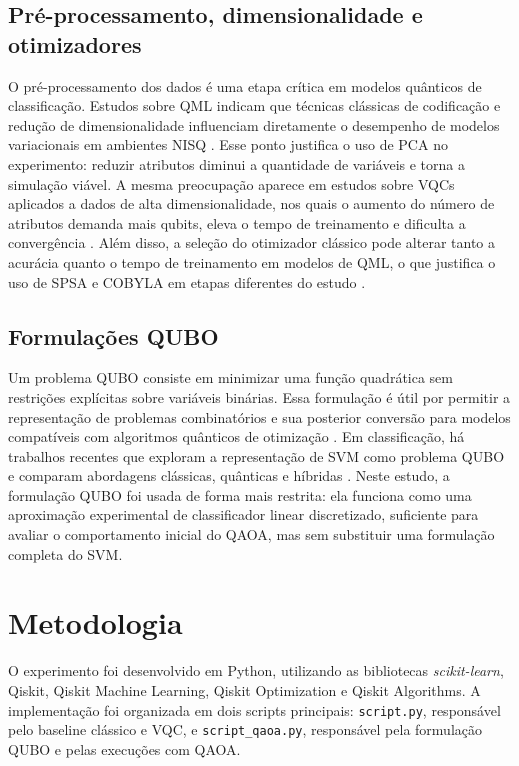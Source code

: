 \documentclass[12pt]{unisenaiclass}
\begin{document}
\subsection{Pré-processamento, dimensionalidade e otimizadores}

O pré-processamento dos dados é uma etapa crítica em modelos quânticos de classificação. Estudos sobre QML indicam que técnicas clássicas de codificação e redução de dimensionalidade influenciam diretamente o desempenho de modelos variacionais em ambientes NISQ \cite{mancilla2022qmlpreprocessing}. Esse ponto justifica o uso de PCA no experimento: reduzir atributos diminui a quantidade de variáveis e torna a simulação viável. A mesma preocupação aparece em estudos sobre VQCs aplicados a dados de alta dimensionalidade, nos quais o aumento do número de atributos demanda mais qubits, eleva o tempo de treinamento e dificulta a convergência \cite{qi2025hevqc}. Além disso, a seleção do otimizador clássico pode alterar tanto a acurácia quanto o tempo de treinamento em modelos de QML, o que justifica o uso de SPSA e COBYLA em etapas diferentes do estudo \cite{alajmi2025qmloptimizers}.

\subsection{Formulações QUBO}

Um problema QUBO consiste em minimizar uma função quadrática sem restrições explícitas sobre variáveis binárias. Essa formulação é útil por permitir a representação de problemas combinatórios e sua posterior conversão para modelos compatíveis com algoritmos quânticos de otimização \cite{glover2019qubo,lucas2014ising}. Em classificação, há trabalhos recentes que exploram a representação de SVM como problema QUBO e comparam abordagens clássicas, quânticas e híbridas \cite{guddanti2024pneumoniasvmqubo}. Neste estudo, a formulação QUBO foi usada de forma mais restrita: ela funciona como uma aproximação experimental de classificador linear discretizado, suficiente para avaliar o comportamento inicial do QAOA, mas sem substituir uma formulação completa do SVM.

\clearpage

\section{Metodologia}
O experimento foi desenvolvido em Python, utilizando as bibliotecas \textit{scikit-learn}, Qiskit, Qiskit Machine Learning, Qiskit Optimization e Qiskit Algorithms. A implementação foi organizada em dois scripts principais: \texttt{script.py}, responsável pelo baseline clássico e VQC, e \texttt{script\_qaoa.py}, responsável pela formulação QUBO e pelas execuções com QAOA.
\end{document}
